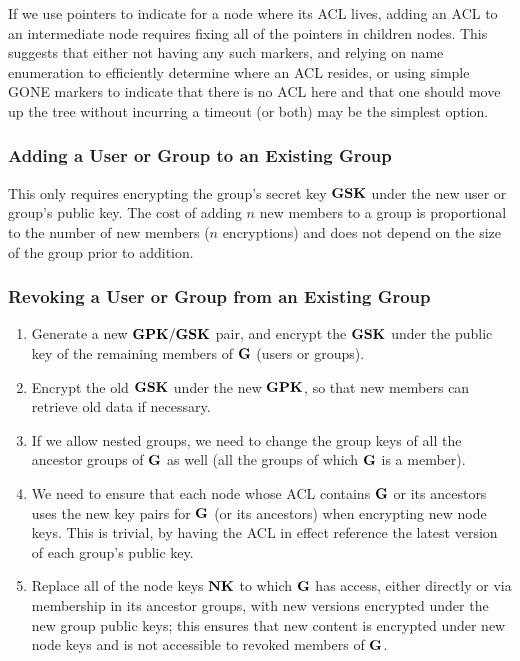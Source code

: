 If we use pointers to indicate for a node where its ACL lives, adding
an ACL to an intermediate node requires fixing all of the pointers in
children nodes. This suggests that either not having any such markers,
and relying on name enumeration to efficiently determine where an ACL
resides, or using simple GONE markers to indicate that there is no ACL
here and that one should move up the tree without incurring a timeout
(or both) may be the simplest option.


\subsubsection{Adding a User or Group to an Existing Group}

This only requires encrypting the group's secret key ${\textbf{GSK}}$ under the
new user or group's public key. The cost of adding $n$ new members to
a group is proportional to the number of new members ($n$ encryptions)
and does not depend on the size of the group prior to addition.


\subsubsection{Revoking a User or Group from an Existing Group}

\begin{enumerate}
\item Generate a new ${\textbf{GPK}}/{\textbf{GSK}}$ pair, and encrypt the ${\textbf{GSK}}$ under
  the public key of the remaining members of ${\textbf{G}}$ (users or groups).
\item Encrypt the old ${\textbf{GSK}}$ under the new ${\textbf{GPK}}$, so that new members can retrieve old data if necessary.
\item If we allow nested groups, we need to change the group keys of all the ancestor groups of ${\textbf{G}}$ as well (all the groups of which ${\textbf{G}}$ is a member).
\item We need to ensure that each node whose ACL contains ${\textbf{G}}$ or its
  ancestors uses the new key pairs for ${\textbf{G}}$ (or its ancestors) when
  encrypting new node keys. This is trivial, by having the ACL in
  effect reference the latest version of each group's public key.
\item Replace all of the node keys ${\textbf{NK}}$ to which ${\textbf{G}}$ has access,
  either directly or via membership in its ancestor groups, with new
  versions encrypted under the new group public keys; this ensures
  that new content is encrypted under new node keys and is not
  accessible to revoked members of ${\textbf{G}}$.
\end{enumerate}


